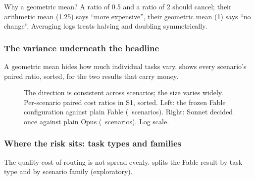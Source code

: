 Why a geometric mean? A ratio of 0.5 and a ratio of 2 should cancel; their arithmetic mean (1.25) says ``more
expensive'', their geometric mean (1) says ``no change''. Averaging logs treats halving and doubling symmetrically.

\subsubsection{The variance underneath the headline}

A geometric mean hides how much individual tasks vary.  shows every scenario's paired ratio, sorted, for the two results that carry money.

\begin{figure}[htbp]
\centering
{}\par\smallskip

\caption{The direction is consistent across scenarios; the size varies widely. Per-scenario paired cost ratios in S1, sorted. Left: the frozen Fable configuration against plain Fable
(\PsFableN\ scenarios). Right: Sonnet decided once against plain Opus (\PsOpusN\ scenarios). Log scale.}
\label{fig:perscen}
\end{figure}

\subsubsection{Where the risk sits: task types and families}

The quality cost of routing is not spread evenly.  splits the Fable result by task type and by scenario family (exploratory).

